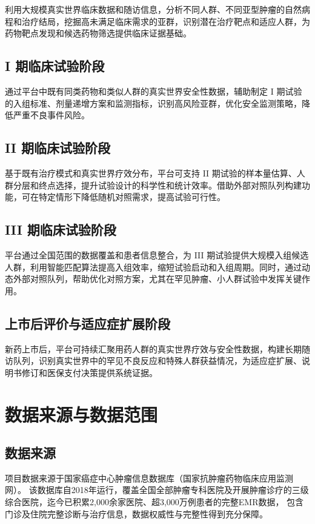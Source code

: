 \documentclass[12pt, a4paper, fontset=mac]{ctexart} %
\begin{document}
利用大规模真实世界临床数据和随访信息，分析不同人群、不同亚型肿瘤的自然病程和治疗结局，挖掘高未满足临床需求的亚群，识别潜在治疗靶点和适应人群，为药物靶点发现和候选药物筛选提供临床证据基础。

\subsection{I 期临床试验阶段}

通过平台中既有同类药物和类似人群的真实世界安全性数据，辅助制定 I 期试验的入组标准、剂量递增方案和监测指标，识别高风险亚群，优化安全监测策略，降低严重不良事件风险。

\subsection{II 期临床试验阶段}

基于既有治疗模式和真实世界疗效分布，平台可支持 II 期试验的样本量估算、人群分层和终点选择，提升试验设计的科学性和统计效率。借助外部对照队列构建功能，可在特定情形下降低随机对照需求，提高试验可行性。

\subsection{III 期临床试验阶段}

平台通过全国范围的数据覆盖和患者信息整合，为 III 期试验提供大规模入组候选人群，利用智能匹配算法提高入组效率，缩短试验启动和入组周期。同时，通过动态外部对照队列，帮助优化对照方案，尤其在罕见肿瘤、小人群试验中发挥关键作用。

\subsection{上市后评价与适应症扩展阶段}

新药上市后，平台可持续汇聚用药人群的真实世界疗效与安全性数据，构建长期随访队列，识别真实世界中的罕见不良反应和特殊人群获益情况，为适应症扩展、说明书修订和医保支付决策提供系统证据。

\section{数据来源与数据范围}

\subsection{数据来源}

项目数据来源于国家癌症中心肿瘤信息数据库（国家抗肿瘤药物临床应用监测网）。
该数据库自2018年运行，覆盖全国全部肿瘤专科医院及开展肿瘤诊疗的三级综合医院，迄今已积累2,000余家医院、超3,000万例患者的完整EMR数据，
包含门诊及住院完整诊断与治疗信息，数据权威性与完整性得到充分保障\cite{ncc_internal_db}。
\end{document}

